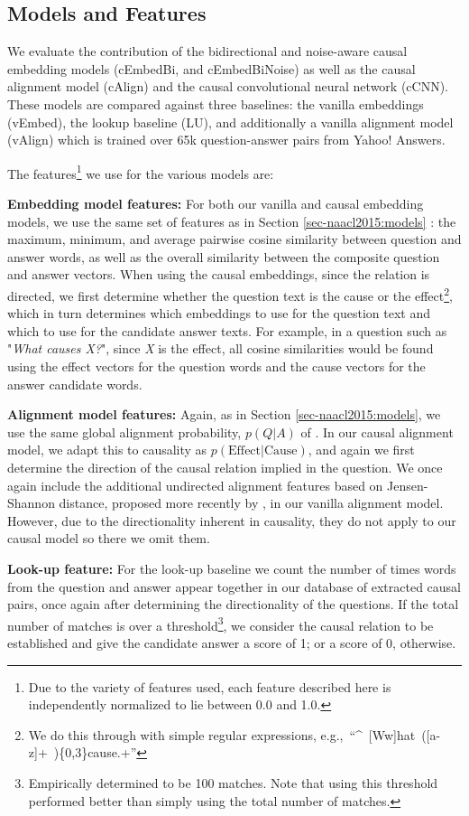 \subsection{Models and Features}

We evaluate the contribution of the bidirectional and noise-aware causal embedding models (cEmbedBi, and cEmbedBiNoise) as well as the causal alignment model (cAlign) and the causal convolutional neural network (cCNN).  These models are compared against three baselines: the vanilla embeddings (vEmbed), the lookup baseline (LU), and additionally a vanilla alignment model (vAlign) which is trained over 65k question-answer pairs from Yahoo! Answers.

The features\footnote{Due to the variety of features used, each feature described here is independently normalized to lie between 0.0 and 1.0.} we use for the various models are:

{ \flushleft \textbf{Embedding model features:}}
For both our vanilla and causal embedding models, we use the same set of features as in Section \ref{sec-naacl2015:models} \citep{fried2015higher}: the maximum, minimum, and average pairwise cosine similarity between question and answer words, as well as the overall similarity between the composite question and answer vectors.  
When using the causal embeddings, since the relation is directed, we first determine whether the question text is the cause or the effect\footnote{We do this through with simple regular expressions, \mbox{e.g., ``\^~[Ww]hat ([a-z]+ )\{0,3\}cause.+''}}, which in turn determines which embeddings to use for the question text and which to use for the candidate answer texts.  For example, in a question such as "\emph{What causes X?}", since \emph{X} is the effect, all cosine similarities would be found using the effect vectors for the question words and the cause vectors for the answer candidate words. 

{\flushleft \textbf{Alignment model features:}} Again, as in Section \ref{sec-naacl2015:models}, we use the same global alignment probability, $p(Q|A)$ of \citet{Surdeanu:11}. In our causal alignment model, we adapt this to causality as $p(\text{Effect}|\text{Cause})$, and again we first determine the direction of the causal relation implied in the question.  We once again include the additional undirected alignment features based on Jensen-Shannon distance, proposed more recently by \citet{fried2015higher}, in our vanilla alignment model.  However, due to the directionality inherent in causality, they do not apply to our causal model so there we omit them.

{\flushleft \textbf{Look-up feature:}} For the look-up baseline we count the number of times words from the question and answer appear together in our database of extracted causal pairs, once again after determining the directionality of the questions.  If the total number of matches is over a threshold\footnote{Empirically determined to be 100 matches.  Note that using this threshold performed better than simply using the total number of matches.}, we consider the causal relation to be established and give the candidate answer a score of 1; or a score of 0, otherwise.
